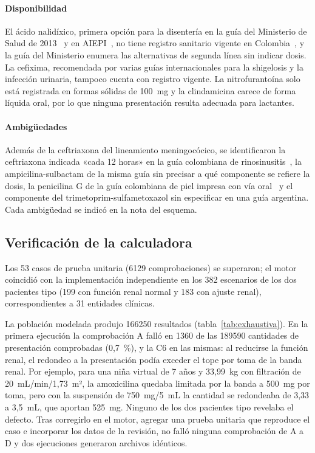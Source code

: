 \documentclass[11pt,a4paper]{article}
\begin{document}
\paragraph{Disponibilidad} El ácido nalidíxico, primera opción para la disentería en la guía del Ministerio de Salud de 2013~\citep{gpc8} y en AIEPI~\citep{aiepi2012}, no tiene registro sanitario vigente en Colombia~\citep{invima}, y la guía del Ministerio enumera las alternativas de segunda línea sin indicar dosis. La cefixima, recomendada por varias guías internacionales para la shigelosis y la infección urinaria, tampoco cuenta con registro vigente. La nitrofurantoína solo está registrada en formas sólidas de 100~mg y la clindamicina carece de forma líquida oral, por lo que ninguna presentación resulta adecuada para lactantes.

\paragraph{Ambigüedades} Además de la ceftriaxona del lineamiento meningocócico, se identificaron la ceftriaxona indicada «cada 12 horas» en la guía colombiana de rinosinusitis~\citep{acorlrs2024}, la ampicilina-sulbactam de la misma guía sin precisar a qué componente se refiere la dosis, la penicilina G de la guía colombiana de piel impresa con vía oral~\citep{acin2023} y el componente del trimetoprim-sulfametoxazol sin especificar en una guía argentina. Cada ambigüedad se indicó en la nota del esquema.

\subsection{Verificación de la calculadora}

Los 53 casos de prueba unitaria (\num{6129} comprobaciones) se superaron; el motor coincidió con la implementación independiente en los 382 escenarios de los dos pacientes tipo (199 con función renal normal y 183 con ajuste renal), correspondientes a 31 entidades clínicas.

La población modelada produjo \num{166250} resultados (tabla~\ref{tab:exhaustiva}). En la primera ejecución la comprobación A falló en \num{1360} de las \num{189590} cantidades de presentación comprobadas (0,7~\%), y la C6 en las mismas: al reducirse la función renal, el redondeo a la presentación podía exceder el tope por toma de la banda renal. Por ejemplo, para una niña virtual de 7 años y 33,99~kg con filtración de 20~mL/min/1,73~m², la amoxicilina quedaba limitada por la banda a 500~mg por toma, pero con la suspensión de 750~mg/5~mL la cantidad se redondeaba de 3,33 a 3,5~mL, que aportan 525~mg. Ninguno de los dos pacientes tipo revelaba el defecto. Tras corregirlo en el motor, agregar una prueba unitaria que reproduce el caso e incorporar los datos de la revisión, no falló ninguna comprobación de A a D y dos ejecuciones generaron archivos idénticos.
\end{document}
